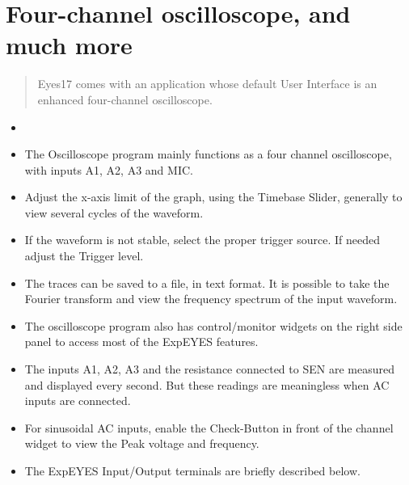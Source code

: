 \documentclass[a4paper,12pt,english]{sphinxmanual}
\let\sphinxpxdimen\pdfpxdimen\else\newdimen\sphinxpxdimen
\begin{document}
\section{Four-channel oscilloscope, and much more}
\label{\detokenize{3.0:four-channel-oscilloscope-and-much-more}}\label{\detokenize{3.0::doc}}\begin{quote}

Eyes17 comes with an application whose default User Interface is an
enhanced four-channel oscilloscope.
\end{quote}
\begin{itemize}
\item {} 

\item {} 
The Oscilloscope program mainly functions as a four channel
oscilloscope, with inputs A1, A2, A3 and MIC.

\item {} 
Adjust the x-axis limit of the graph, using the Timebase Slider,
generally to view several cycles of the waveform.

\item {} 
If the waveform is not stable, select the proper trigger source. If
needed adjust the Trigger level.

\item {} 
The traces can be saved to a file, in text format. It is possible to
take the Fourier transform and view the frequency spectrum of the
input waveform.

\item {} 
The oscilloscope program also has control/monitor widgets on the
right side panel to access most of the ExpEYES features.

\item {} 
The inputs A1, A2, A3 and the resistance connected to SEN are
measured and displayed every second. But these readings are
meaningless when AC inputs are connected.

\item {} 
For sinusoidal AC inputs, enable the Check-Button in front of the
channel widget to view the Peak voltage and frequency.

\item {} 
The ExpEYES Input/Output terminals are briefly described below.

\end{itemize}

\begin{figure}[htbp]
\centering

\noindent\sphinxincludegraphics[width=300\sphinxpxdimen]{{scope-outputs}.pdf}
\end{figure}
\end{document}
